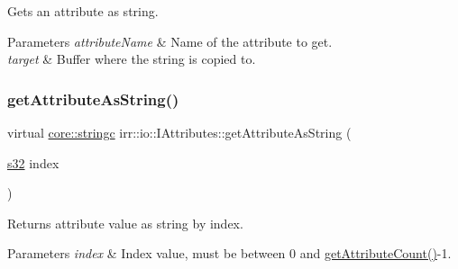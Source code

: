 Gets an attribute as string. 


\begin{DoxyParams}{Parameters}
{\em attribute\+Name} & Name of the attribute to get. \\
\hline
{\em target} & Buffer where the string is copied to. \\
\hline
\end{DoxyParams}
\mbox{\label{classirr_1_1io_1_1IAttributes_a9938e13ea4cc3e8e0ea3fadacaa97c5c}} 
\subsubsection{\texorpdfstring{get\+Attribute\+As\+String()}{getAttributeAsString()}\hspace{0.1cm}{\footnotesize\ttfamily [5/6]}}
{\footnotesize\ttfamily virtual \hyperlink{namespaceirr_1_1core_ab26a0e0359206b5a694f35c37c829d7f}{core\+::stringc} irr\+::io\+::\+I\+Attributes\+::get\+Attribute\+As\+String (\begin{DoxyParamCaption}\item[{\hyperlink{namespaceirr_ac66849b7a6ed16e30ebede579f9b47c6}{s32}}]{index }\end{DoxyParamCaption})\hspace{0.3cm}{\ttfamily [pure virtual]}}



Returns attribute value as string by index. 


\begin{DoxyParams}{Parameters}
{\em index} & Index value, must be between 0 and \hyperlink{classirr_1_1io_1_1IAttributes_a796bdd9440ee7ba0b6742a90a82870b6}{get\+Attribute\+Count()}-\/1. \\
\hline
\end{DoxyParams}
\mbox{\label{classirr_1_1io_1_1IAttributes_a9938e13ea4cc3e8e0ea3fadacaa97c5c}} 
